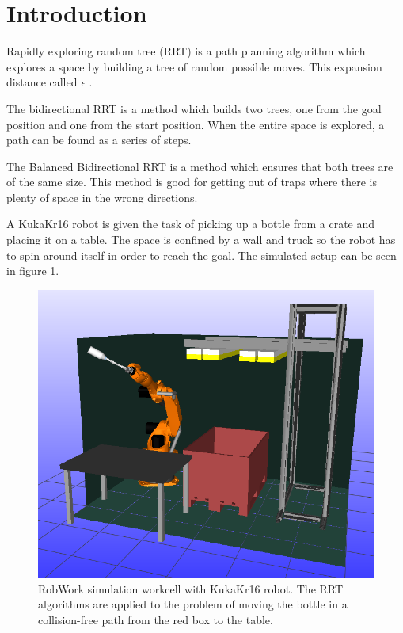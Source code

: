 \section{Introduction} 

Rapidly exploring random tree (RRT) is a path planning algorithm which explores a space by building a tree of random possible moves. 
This expansion distance called \(\epsilon\) \citep{pathplanning}.

The bidirectional RRT is a method which builds two trees, one from the goal position and one from the start position. 
When the entire space is explored, a path can be found as a series of steps.

The Balanced Bidirectional RRT is a method which ensures that both trees are of the same size. 
This method is good for getting out of traps where there is plenty of space in the wrong directions.

A KukaKr16 robot \citep{kukakr16} is given the task of picking up a bottle from a crate and placing it on a table.
The space is confined by a wall and truck so the robot has to spin around itself in order to reach the goal.
The simulated setup can be seen in figure \ref{fig:worckcell_bottle_picked}.

\begin{figure}[H]
 \centering
 \includegraphics[width=\figsize]{graphics/robworkpic}
 \caption{RobWork simulation workcell with KukaKr16 robot.
 The RRT algorithms are applied to the problem of moving the bottle
 in a collision-free path from the red box to the table.}
 \label{fig:worckcell_bottle_picked}
\end{figure}

